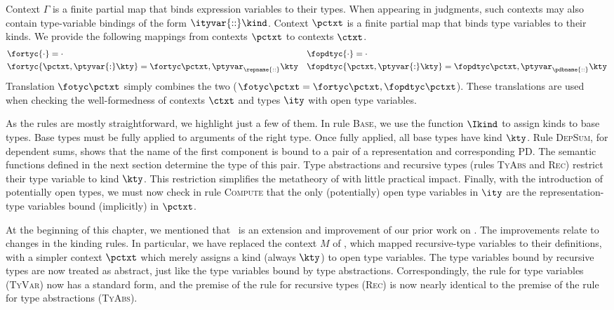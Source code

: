 Context $\Gamma$ is a finite partial map that binds expression
variables to their types. When appearing in \fomega{} judgments, such
contexts may also contain type-variable bindings of the form $\ityvar{::}\kind$.
Context $\pctxt$ is a finite partial map that binds type
variables to their kinds. We provide the following mappings from
\ddc{} contexts $\pctxt$ to \fomega{} contexts $\ctxt$.
\begin{align*}
&\fortyc {\cdot} = \cdot & &\fopdtyc {\cdot} = \cdot \\
&\fortyc {\pctxt,\ptyvar{:}\kty} = \fortyc \pctxt, \ptyvar_\repname
{\mathrel{::}} \kty 
&
&\fopdtyc {\pctxt,\ptyvar{:}\kty} = \fopdtyc \pctxt, \ptyvar_\pdbname
{\mathrel{::}} \kty
\end{align*}
Translation $\fotyc
\pctxt$ simply combines the two ($\fotyc \pctxt = \fortyc \pctxt,
\fopdtyc \pctxt$). These translations are used when checking the
well-formedness of contexts $\ctxt$ and types $\ity$ with open type
variables.

As the rules are mostly straightforward, we highlight just a few of
them. In rule \textsc{Base}, we use the function $\Ikind$ to assign
kinds to base types.  Base types must be fully applied to arguments of
the right type.  Once fully applied, all base types have kind $\kty$.
Rule \textsc{DepSum}, for dependent sums, shows that the name of the first component is
bound to a pair of a representation and corresponding PD.  The
semantic functions defined in the next section determine the type of
this pair. Type abstractions and recursive types (rules \textsc{TyAbs}
and \textsc{Rec}) restrict their type
variable to kind $\kty$. This restriction simplifies the metatheory
of \ddc with little practical impact.
Finally, with the introduction of potentially open \implang types, we
must now check in rule \textsc{Compute} that the only (potentially)
open type variables in $\ity$ are the representation-type variables
bound (implicitly) in $\pctxt$.

At the beginning of this chapter, we mentioned that \ddc\ is an
extension and improvement of our prior work on \ddcold. The
improvements relate to changes in the kinding rules. In particular, we
have replaced the context $M$ of \ddcold{}, which mapped
recursive-type variables to their definitions, with a simpler context
$\pctxt$ which merely assigns a kind (always $\kty$) to open type
variables.  The type variables bound by recursive types are now
treated as abstract, just like the type variables bound by type
abstractions.  Correspondingly, the rule for type variables
(\textsc{TyVar}) now has a standard form, and the premise of the rule
for recursive types (\textsc{Rec}) is now nearly identical to the
premise of the rule for type abstractions (\textsc{TyAbs}).


